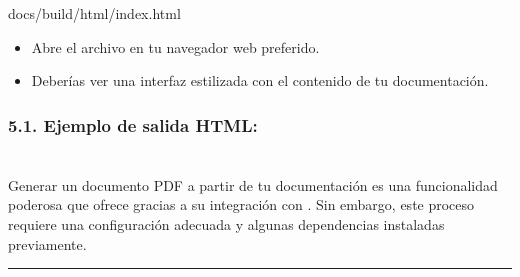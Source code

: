 \documentclass[a4paper,10pt,spanish]{sphinxmanual}
\begin{document}
\begin{sphinxVerbatim}[commandchars=\\\{\}]
docs/build/html/index.html
\end{sphinxVerbatim}
\begin{itemize}
\item {} 
\sphinxAtStartPar
Abre el archivo  en tu navegador web preferido.

\item {} 
\sphinxAtStartPar
Deberías ver una interfaz estilizada con el contenido de tu documentación.

\end{itemize}


\subsubsection{5.1. Ejemplo de salida HTML:}
\label{\detokenize{configuracion_inicial/008.Generar_HTML:ejemplo-de-salida-html}}
\sphinxAtStartPar
{}

\sphinxstepscope


\section{}
\label{\detokenize{configuracion_inicial/009.Generar_PDF:generacion-de-pdf-a-partir-de-la-documentacion}}\label{\detokenize{configuracion_inicial/009.Generar_PDF::doc}}
\sphinxAtStartPar
Generar un documento PDF a partir de tu documentación es una funcionalidad poderosa que ofrece  gracias a su integración con . Sin embargo, este proceso requiere una configuración adecuada y algunas dependencias instaladas previamente.


\bigskip\hrule\bigskip
\end{document}
